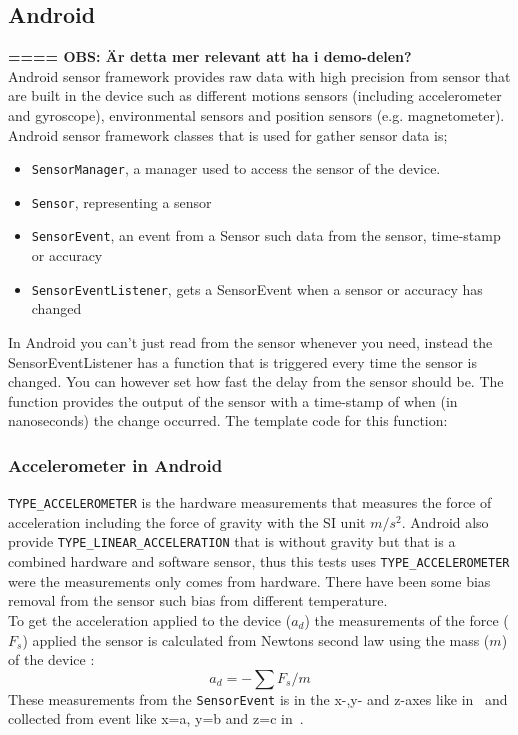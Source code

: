 \subsection{Android}\label{subsec:Android}
\textbf{==== OBS: Är detta mer relevant att ha i demo-delen?} \\
Android sensor framework provides raw data with high precision from sensor that are built in the device such as different motions sensors (including accelerometer and gyroscope), environmental sensors and position sensors (e.g. magnetometer). \cite[]{android:sensor}
Android sensor framework classes that is used for gather sensor data is; 
\begin{itemize}
	\item[] \texttt{SensorManager}, a manager used to access the sensor of the device. 
	\item[] \texttt{Sensor}, representing a sensor
	\item[] \texttt{SensorEvent}, an event from a Sensor such data from the sensor, time-stamp or accuracy
	\item[] \texttt{SensorEventListener}, gets a SensorEvent when a sensor or accuracy has changed 
\end{itemize}
In Android you can't just read from the sensor whenever you need, instead the SensorEventListener has a function that is triggered every time the sensor is changed. You can however set how fast the delay from the sensor should be. The function provides the output of the sensor with a time-stamp of when (in nanoseconds) the change occurred. The template code for this function:

\cite[]{android:sensorEvent} 



\subsubsection{Accelerometer in Android}\label{subsec:accAndroid}
\texttt{TYPE\_ACCELEROMETER} is the hardware measurements that measures the force of acceleration including the force of gravity with the SI unit $m/s^2$. Android also provide \texttt{TYPE\_LINEAR\_ACCELERATION} that is without gravity but that is a combined hardware and software sensor, thus this tests uses  \texttt{TYPE\_ACCELEROMETER} were the measurements only comes from hardware. There have been some bias removal from the sensor such bias from different temperature. \\
To get the acceleration applied to the device ($a_d$) the measurements of the force ($F_s$) applied the sensor is calculated from Newtons second law using the mass ($m$) of the device :
$$a_d=-\sum F_s / m $$ 
These measurements from the \texttt{SensorEvent} is in the x-,y- and z-axes like in~ and collected from event like x=a, y=b and z=c in~. \cite[]{android:sensorEvent}


